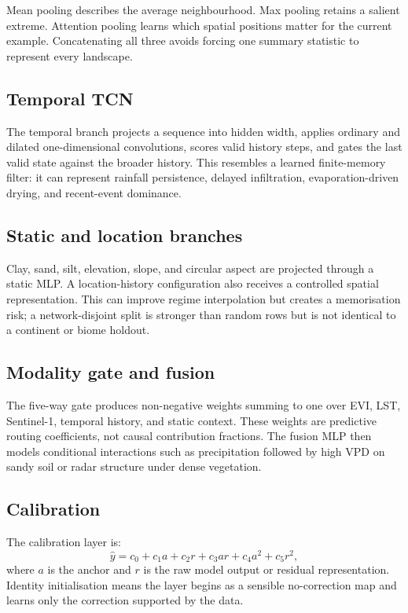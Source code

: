 \documentclass[12pt,a4paper]{report}
\begin{document}
Mean pooling describes the average neighbourhood. Max pooling retains a
salient extreme. Attention pooling learns which spatial positions matter for
the current example. Concatenating all three avoids forcing one summary
statistic to represent every landscape.

\subsection{Temporal TCN}
The temporal branch projects a sequence into hidden width, applies ordinary and
dilated one-dimensional convolutions, scores valid history steps, and gates the
last valid state against the broader history. This resembles a learned
finite-memory filter: it can represent rainfall persistence, delayed
infiltration, evaporation-driven drying, and recent-event dominance.

\subsection{Static and location branches}
Clay, sand, silt, elevation, slope, and circular aspect are projected through a
static MLP. A location-history configuration also receives a controlled spatial
representation. This can improve regime interpolation but creates a memorisation
risk; a network-disjoint split is stronger than random rows but is not identical
to a continent or biome holdout.

\subsection{Modality gate and fusion}
The five-way gate produces non-negative weights summing to one over EVI, LST,
Sentinel-1, temporal history, and static context. These weights are predictive
routing coefficients, not causal contribution fractions. The fusion MLP then
models conditional interactions such as precipitation followed by high VPD on
sandy soil or radar structure under dense vegetation.

\subsection{Calibration}
The calibration layer is:
\[
\hat{y}=c_0+c_1a+c_2r+c_3ar+c_4a^2+c_5r^2,
\]
where $a$ is the anchor and $r$ is the raw model output or residual representation.
Identity initialisation means the layer begins as a sensible no-correction map
and learns only the correction supported by the data.
\end{document}
